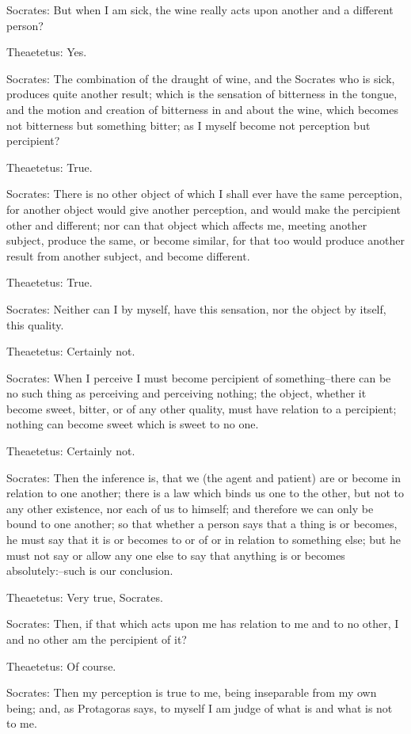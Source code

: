 Socrates: But when I am sick, the wine really acts upon another and a
different person?

Theaetetus: Yes.

Socrates: The combination of the draught of wine, and the Socrates
who is sick, produces quite another result; which is the sensation of
bitterness in the tongue, and the motion and creation of bitterness in
and about the wine, which becomes not bitterness but something bitter;
as I myself become not perception but percipient?

Theaetetus: True.

Socrates: There is no other object of which I shall ever have the same
perception, for another object would give another perception, and would
make the percipient other and different; nor can that object which
affects me, meeting another subject, produce the same, or become
similar, for that too would produce another result from another subject,
and become different.

Theaetetus: True.

Socrates: Neither can I by myself, have this sensation, nor the object
by itself, this quality.

Theaetetus: Certainly not.

Socrates: When I perceive I must become percipient of something--there
can be no such thing as perceiving and perceiving nothing; the object,
whether it become sweet, bitter, or of any other quality, must have
relation to a percipient; nothing can become sweet which is sweet to no
one.

Theaetetus: Certainly not.

Socrates: Then the inference is, that we (the agent and patient) are or
become in relation to one another; there is a law which binds us one to
the other, but not to any other existence, nor each of us to himself;
and therefore we can only be bound to one another; so that whether
a person says that a thing is or becomes, he must say that it is or
becomes to or of or in relation to something else; but he must not
say or allow any one else to say that anything is or becomes
absolutely:--such is our conclusion.

Theaetetus: Very true, Socrates.

Socrates: Then, if that which acts upon me has relation to me and to no
other, I and no other am the percipient of it?

Theaetetus: Of course.

Socrates: Then my perception is true to me, being inseparable from my
own being; and, as Protagoras says, to myself I am judge of what is and
what is not to me.

